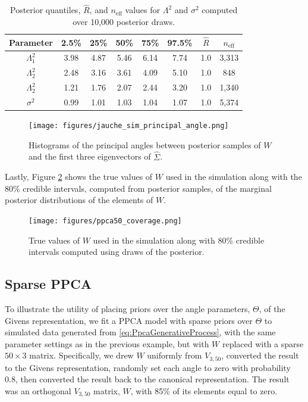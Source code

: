 \documentclass[ba]{imsart}
\numberwithin{equation}{section}
\theoremstyle{plain}
\begin{document}
\begin{table}
\begin{tabular}{|c||ccccccc|}
\hline
Parameter & 2.5\% & 25\% & 50\% & 75\% & 97.5\% &  $\hat{R}$ & $n_{\mathrm{eff}}$\\
\hline
\hline
$\Lambda_1^2$  & 3.98 & 4.87 & 5.46 & 6.14 & 7.74 & 1.0 & 3,313\\
$\Lambda_2^2$  & 2.48 & 3.16 & 3.61 & 4.09 & 5.10 & 1.0 & 848\\
$\Lambda_2^2$  & 1.21 & 1.76 & 2.07 & 2.44 & 3.20 & 1.0 & 1,340 \\
$\sigma^2$ & 0.99 & 1.01 & 1.03 & 1.04 & 1.07 & 1.0 & 5,374\\
\hline
\end{tabular}
\caption{Posterior quantiles, $\hat{R}$, and $n_{\mathrm{eff}}$ values for $\Lambda^2$ and $\sigma^2$ computed over 10,000 posterior draws.}
\label{tab:ppca50}
\end{table}

\begin{figure}[h]
\centering
\vspace{.1in}
\texttt{[image: figures/jauche\_sim\_principal\_angle.png]}
\vspace{.05in}
\caption{Histograms of the principal angles between posterior samples of $W$ and the first three eigenvectors of $\hat{\Sigma}$.}
\label{fig:ppca50_principal_angle}
\end{figure}

\noindent Lastly, Figure \ref{fig:ppca50_coverage} shows the true values of $W$ used in the simulation along with the 80\% credible intervals, computed from posterior samples, of the marginal posterior distributions of the elements of $W$. 

\begin{figure}[h]
\centering
\vspace{.1in}
\texttt{[image: figures/ppca50\_coverage.png]}
\vspace{.05in}
\caption{True values of $W$ used in the simulation along with 80\% credible intervals computed using draws of the posterior.}
\label{fig:ppca50_coverage}
\end{figure}


\subsection{Sparse PPCA}
To illustrate the utility of placing priors over the angle parameters, $\Theta$, of the Givens representation, we fit a PPCA model with sparse priors over $\Theta$ to simulated data generated from \ref{eq:PpcaGenerativeProcess}, with the same parameter settings as in the previous example, but with $W$ replaced with a sparse $50 \times 3$ matrix. Specifically, we drew $W$ uniformly from $V_{3,50}$, converted the result to the Givens representation, randomly set each angle to zero with probability 0.8, then converted the result back to the canonical representation. The result was an orthogonal $V_{3,50}$ matrix, $W$, with 85\% of its elements equal to zero.
\end{document}
